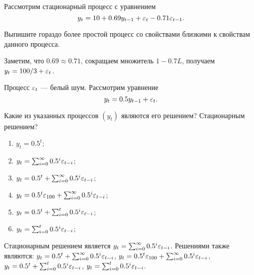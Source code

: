 \begin{problem}
Рассмотрим стационарный процесс с уравнением
\[
y_t = 10 + 0.69 y_{t-1} + \varepsilon_t - 0.71 \varepsilon_{t-1}.
\]

Выпишите гораздо более простой процесс со свойствами близкими к свойствам данного процесса.
\begin{sol}
Заметим, что $0.69\approx 0.71$, сокращаем множитель $1-0.7L$, получаем $y_t = 100/3 + \varepsilon_t$.
\end{sol}
\end{problem}


\begin{problem}
Процесс $\varepsilon_t$ — белый шум. Рассмотрим уравнение
\[
y_t = 0.5 y_{t-1} + \varepsilon_t.
\]

Какие из указанных процессов $(y_t)$ являются его решением? Стационарным решением?
\begin{enumerate}
  \item $y_t = 0.5^t$;
  \item $y_t = \sum_{i=0}^{\infty} 0.5^i \varepsilon_{t-i}$;
  \item $y_t = 0.5^t + \sum_{i=0}^{\infty} 0.5^i \varepsilon_{t-i}$;
  \item $y_t = 0.5^t\varepsilon_{100} + \sum_{i=0}^{\infty} 0.5^i \varepsilon_{t-i}$;
  \item $y_t = 0.5^t + \sum_{i=0}^{t} 0.5^i \varepsilon_{t-i}$;
  \item $y_t = \sum_{i=0}^{t} 0.5^i \varepsilon_{t-i}$;
\end{enumerate}


\begin{sol}
Стационарным решением является $y_t = \sum_{i=0}^{\infty} 0.5^i \varepsilon_{t-i}$. 
Решениями также являются: $y_t = 0.5^t + \sum_{i=0}^{\infty} 0.5^i \varepsilon_{t-i}$, $y_t = 0.5^t\varepsilon_{100} + \sum_{i=0}^{\infty} 0.5^i \varepsilon_{t-i}$, $y_t = 0.5^t + \sum_{i=0}^{t} 0.5^i \varepsilon_{t-i}$, $y_t = \sum_{i=0}^{t} 0.5^i \varepsilon_{t-i}$.
\end{sol}
\end{problem}



